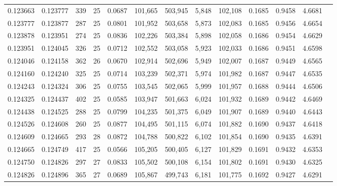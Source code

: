 \begin{tabular}{rrrrrrrrrrrrr}
0.123663 & 0.123777 & 339 &  25 &                                     0.0687 & 101,665 & 503,945 &   5,848 & 102,108 & 0.1685 & 0.9458 & 4.6681 \\
0.123777 & 0.123877 & 287 &  25 &                                     0.0801 & 101,952 & 503,658 &   5,873 & 102,083 & 0.1685 & 0.9456 & 4.6654 \\
0.123878 & 0.123951 & 274 &  25 &                                     0.0836 & 102,226 & 503,384 &   5,898 & 102,058 & 0.1686 & 0.9454 & 4.6629 \\
0.123951 & 0.124045 & 326 &  25 &                                     0.0712 & 102,552 & 503,058 &   5,923 & 102,033 & 0.1686 & 0.9451 & 4.6598 \\
0.124046 & 0.124158 & 362 &  26 &                                     0.0670 & 102,914 & 502,696 &   5,949 & 102,007 & 0.1687 & 0.9449 & 4.6565 \\
0.124160 & 0.124240 & 325 &  25 &                                     0.0714 & 103,239 & 502,371 &   5,974 & 101,982 & 0.1687 & 0.9447 & 4.6535 \\
0.124243 & 0.124324 & 306 &  25 &                                     0.0755 & 103,545 & 502,065 &   5,999 & 101,957 & 0.1688 & 0.9444 & 4.6506 \\
0.124325 & 0.124437 & 402 &  25 &                                     0.0585 & 103,947 & 501,663 &   6,024 & 101,932 & 0.1689 & 0.9442 & 4.6469 \\
0.124438 & 0.124525 & 288 &  25 &                                     0.0799 & 104,235 & 501,375 &   6,049 & 101,907 & 0.1689 & 0.9440 & 4.6443 \\
0.124526 & 0.124608 & 260 &  25 &                                     0.0877 & 104,495 & 501,115 &   6,074 & 101,882 & 0.1690 & 0.9437 & 4.6418 \\
0.124609 & 0.124665 & 293 &  28 &                                     0.0872 & 104,788 & 500,822 &   6,102 & 101,854 & 0.1690 & 0.9435 & 4.6391 \\
0.124665 & 0.124749 & 417 &  25 &                                     0.0566 & 105,205 & 500,405 &   6,127 & 101,829 & 0.1691 & 0.9432 & 4.6353 \\
0.124750 & 0.124826 & 297 &  27 &                                     0.0833 & 105,502 & 500,108 &   6,154 & 101,802 & 0.1691 & 0.9430 & 4.6325 \\
0.124826 & 0.124896 & 365 &  27 &                                     0.0689 & 105,867 & 499,743 &   6,181 & 101,775 & 0.1692 & 0.9427 & 4.6291 \\

\end{tabular}
